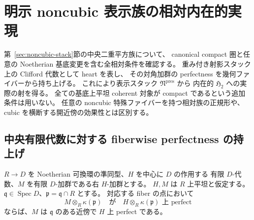 \section{明示 noncubic 表示族の相対内在的実現}
\label{sec:relative-noncubic-families}

第~\ref{sec:noncubic-stack}節の中央二重平方族について、
canonical compact 圏と任意の Noetherian 基底変更を含む全相対条件を確認する。
重み付き射影スタック上の Clifford 代数として heart を表し、
その対角加群の perfectness を幾何ファイバーから持ち上げる。
これにより表示スタック $\mathfrak N^{\mathrm{pres}}$ から
内在的 $\mathfrak H_2$ への実際の射を得る。
全ての基底上平坦 coherent 対象が compact であるという追加条件は用いない。
任意の noncubic 特殊ファイバーを持つ相対族の正規形や、
cubic を横断する開近傍の効果性とは区別する。

\subsection{中央有限代数に対する fiberwise perfectness の持上げ}

\begin{lemma}\label{lem:nc-fiber-perfect}
$R\to D$ を Noetherian 可換環の準同型、$H$ を中心に $D$ の作用する
有限 $D$-代数、$M$ を有限 $D$-加群である右 $H$-加群とする。
$H,M$ は $R$ 上平坦と仮定する。
$\mathfrak q\in\operatorname{Spec} D$、$\mathfrak p=\mathfrak q\cap R$ とする。
対応する fiber の点において
\[
 M\otimes_R\kappa(\mathfrak p)
 \quad\text{が}\quad
 H\otimes_R\kappa(\mathfrak p)\text{ 上 perfect}
\]
ならば、$M$ は $\mathfrak q$ のある近傍で $H$ 上 perfect である。
\end{lemma}

